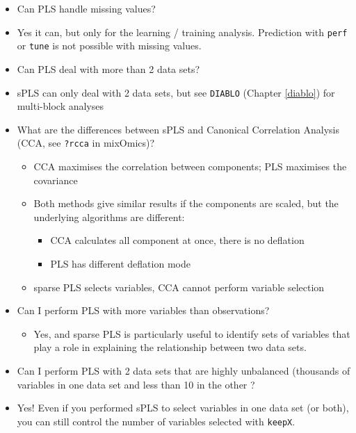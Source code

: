 \documentclass[]{book}
\providecommand{\tightlist}{%
  \setlength{\itemsep}{0pt}\setlength{\parskip}{0pt}}
\theoremstyle{definition}
\theoremstyle{definition}
\theoremstyle{definition}
\theoremstyle{remark}
\begin{document}
\begin{itemize}
\item
  Can PLS handle missing values?
\item
  Yes it can, but only for the learning / training analysis. Prediction
  with \texttt{perf} or \texttt{tune} is not possible with missing
  values.
\item
  Can PLS deal with more than 2 data sets?
\item
  sPLS can only deal with 2 data sets, but see \texttt{DIABLO} (Chapter
  \ref{diablo}) for multi-block analyses
\item
  What are the differences between sPLS and Canonical Correlation
  Analysis (CCA, see \texttt{?rcca} in mixOmics)?

  \begin{itemize}
  \tightlist
  \item
    CCA maximises the correlation between components; PLS maximises the
    covariance
  \item
    Both methods give similar results if the components are scaled, but
    the underlying algorithms are different:

    \begin{itemize}
    \tightlist
    \item
      CCA calculates all component at once, there is no deflation
    \item
      PLS has different deflation mode
    \end{itemize}
  \item
    sparse PLS selects variables, CCA cannot perform variable selection
  \end{itemize}
\item
  Can I perform PLS with more variables than observations?

  \begin{itemize}
  \tightlist
  \item
    Yes, and sparse PLS is particularly useful to identify sets of
    variables that play a role in explaining the relationship between
    two data sets.
  \end{itemize}
\item
  Can I perform PLS with 2 data sets that are highly unbalanced
  (thousands of variables in one data set and less than 10 in the other
  ?
\item
  Yes! Even if you performed sPLS to select variables in one data set
  (or both), you can still control the number of variables selected with
  \texttt{keepX}.
\end{itemize}
\end{document}
